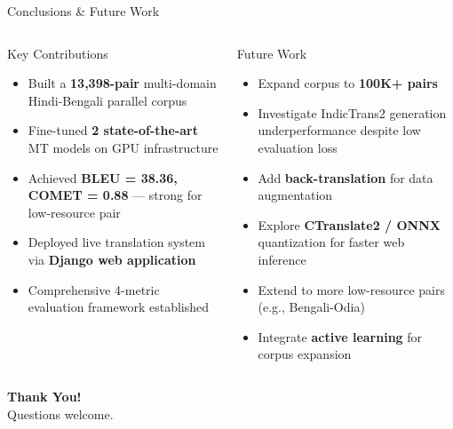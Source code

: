 \documentclass[aspectratio=169]{beamer}
\begin{document}
\begin{frame}{Conclusions \& Future Work}
\begin{columns}[T]
    \begin{block}{Key Contributions}
      \begin{itemize}
        \item[\faCheck] Built a \textbf{13,398-pair} multi-domain Hindi-Bengali parallel corpus
        \item[\faCheck] Fine-tuned \textbf{2 state-of-the-art} MT models on GPU infrastructure
        \item[\faCheck] Achieved \textbf{BLEU = 38.36, COMET = 0.88} — strong for low-resource pair
        \item[\faCheck] Deployed live translation system via \textbf{Django web application}
        \item[\faCheck] Comprehensive 4-metric evaluation framework established
      \end{itemize}
    \end{block}
    \begin{alertblock}{Future Work}
      \begin{itemize}
        \item Expand corpus to \textbf{100K+ pairs}
        \item Investigate IndicTrans2 generation underperformance despite low evaluation loss
        \item Add \textbf{back-translation} for data augmentation
        \item Explore \textbf{CTranslate2 / ONNX} quantization for faster web inference
        \item Extend to more low-resource pairs (e.g., Bengali-Odia)
        \item Integrate \textbf{active learning} for corpus expansion
      \end{itemize}
    \end{alertblock}
\end{columns}
\vspace{0.5em}
\centering
\textcolor{accentamber}{\Large \textbf{Thank You!}} \\
\small Questions welcome.
\end{frame}
\end{document}
